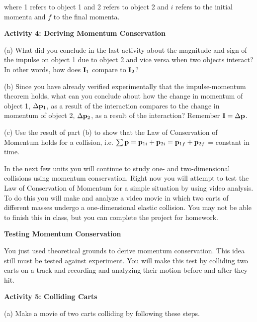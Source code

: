 where 1 refers to object 1 and 2 refers to object 2 and $i$ refers to the initial
momenta and $f$ to the final momenta.

\textbf{Activity 4: Deriving Momentum Conservation }

(a) What did you conclude in the last activity about the magnitude and sign
of the impulse on object 1 due to object 2 and vice versa when two objects interact?
In other words, how does \( {{\bf I}_{1}} \) compare to \( {{\bf I}_{2}} \)? 
\vspace{10mm}

(b) Since you have already verified experimentally that the impulse-momentum
theorem holds, what can you conclude about how the change in momentum of object
1, \( \Delta {{\bf p}_{1}} \), as a result of the interaction compares
to the change in momentum of object 2, \( \Delta {{\bf p}_{2}} \),
as a result of the interaction? Remember \( {\bf I}=\Delta {\bf p} \).
\vspace{25mm}

(c) Use the result of part (b) to show that the Law of Conservation
of Momentum holds for a collision, i.e. \( \sum {\bf p} 
=  {{\bf p}_{1i}}  + {{\bf p}_{2i}}  = {{\bf p}_{1f}} 
+ {{\bf p}_{2f}} \) = constant in time.
\vspace{20mm}

In the next few units you will continue to study one- and two-dimensional collisions
using momentum conservation. Right now you will attempt to test the Law of Conservation
of Momentum for a simple situation by using video analysis. To do this you will
make and analyze a video movie in which two carts of different masses undergo
a one-dimensional elastic collision. You may not be able to finish this in class,
but you can complete the project for homework.

\textbf{Testing Momentum Conservation }

You just used theoretical grounds to derive momentum conservation. This idea
still must be tested against experiment. You will make this test by colliding
two carts on a track and recording and analyzing their motion before and after
they hit.

\textbf{Activity 5: Colliding Carts }

(a) Make a movie of two carts colliding by following these steps. 


